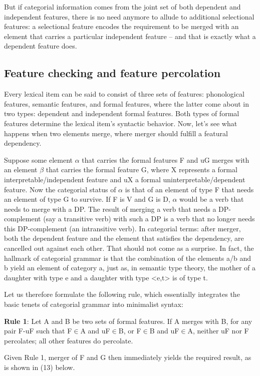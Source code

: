 \documentclass[output=paper
,modfonts
,nonflat]{langsci/langscibook}
\begin{document}
But if categorial information comes from the joint set of both dependent and independent features, there is no need anymore to allude to additional selectional features: a selectional feature encodes the requirement to be merged with an element that carries a particular independent feature – and that is exactly what a dependent feature does.

\subsection{Feature checking and feature percolation}
Every lexical item can be said to consist of three sets of features: phonological features, semantic features, and formal features, where the latter come about in two types: dependent and independent formal features. Both types of formal features determine the lexical item’s syntactic behavior. Now, let’s see what happens when two elements merge, where merger should fulfill a featural dependency.

Suppose some element $\alpha$ that carries the formal features {\lbrack}F{\rbrack} and {\lbrack}uG{\rbrack} merges with an element $\beta$ that carries the formal feature {\lbrack}G{\rbrack}, where {\lbrack}X{\rbrack} represents a formal interpretable/independent feature and {\lbrack}uX{\rbrack} a formal uninterpretable/dependent feature. Now the categorial status of $\alpha$ is that of an element of type F that needs an element of type G to survive. If F is V and G is D, $\alpha$ would be a verb that needs to merge with a DP. The result of merging a verb that needs a DP-complement (say a transitive verb) with such a DP is a verb that no longer needs this DP-complement (an intransitive verb). In categorial terms: after merger, both the dependent feature and the element that satisfies the dependency, are cancelled out against each other. That should not come as a surprise. In fact, the hallmark of categorial grammar is that the combination of the elements a/b and b yield an element of category a, just as, in semantic type theory, the mother of a daughter with type e and a daughter with type <e,t> is of type t. 

Let us therefore formulate the following rule, which essentially integrates the basic tenets of categorial grammar into minimalist syntax:

\begin{exe}
\ex \textbf{Rule 1}: Let A and B be two sets of formal features. If A merges with B, for any pair {\lbrack}F{\rbrack}-{\lbrack}uF{\rbrack} such that {\lbrack}F{\rbrack}$\in$A and {\lbrack}uF{\rbrack}$\in$B, or {\lbrack}F{\rbrack}$\in$B and {\lbrack}uF{\rbrack}$\in$A, neither {\lbrack}uF{\rbrack} nor {\lbrack}F{\rbrack} percolates; all other features do percolate.
\end{exe}
Given Rule 1, merger of {\lbrack}F{\rbrack} and {\lbrack}G{\rbrack} then immediately yields the required result, as is shown in (13) below.
\end{document}
